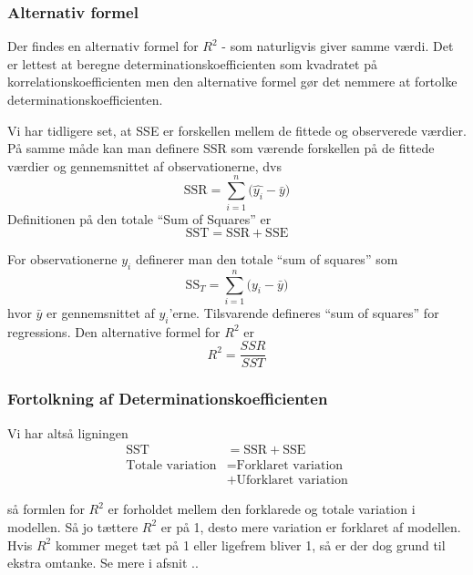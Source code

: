 \subsubsection{Alternativ formel}
Der findes en alternativ formel for \(R^2\) - som naturligvis giver samme værdi. Det er lettest at beregne determinationskoefficienten som kvadratet på korrelationskoefficienten men den alternative formel gør det nemmere at fortolke determinationskoefficienten.

Vi har tidligere set, at SSE er forskellen mellem de fittede og observerede værdier. På samme måde kan man definere SSR som værende forskellen på de fittede værdier og gennemsnittet af observationerne, dvs
\begin{displaymath}
    \textrm{SSR} = \sum_{i=1}^{n} \Big( \widehat{y_i} - \bar{y} \Big)
\end{displaymath}
Definitionen på den totale ``Sum of Squares'' er
\begin{displaymath}
    \textrm{SST} = \textrm{SSR} + \textrm{SSE}
\end{displaymath}

For observationerne \(y_i\) definerer man den totale ``sum of squares'' som
\begin{displaymath}
    \textrm{SS}_T = \sum_{i=1}^{n} \Big( y_i - \bar{y} \Big )
\end{displaymath}
hvor \(\bar{y}\) er gennemsnittet af \(y_i\)'erne. Tilsvarende defineres  ``sum of squares'' for regressions. Den alternative formel for \(R^2\) er
\begin{displaymath}
    R^2 = \frac{SSR}{SST}
\end{displaymath}

\subsubsection{Fortolkning af Determinationskoefficienten}
Vi har altså ligningen
\begin{align}
    \textrm{SST}              &= \textrm{SSR} + \textrm{SSE} \\
    \textrm{Totale variation} &= \textrm{Forklaret variation} \\
                              &+ \textrm{Uforklaret variation}
\end{align}

så formlen for \(R^2\) er forholdet mellem den forklarede og totale variation i modellen. Så jo tættere \(R^2\) er på 1, desto mere variation er forklaret af modellen. Hvis \(R^2\) kommer meget tæt på 1 eller ligefrem bliver 1, så er der dog grund til ekstra omtanke. Se mere i afsnit ..

